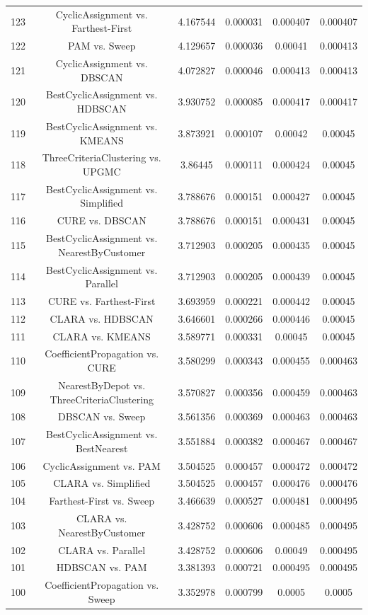 \documentclass[a4paper,10pt]{article}
\begin{document}
\begin{landscape}
\begin{table}[!htp]
\begin{tabular}{cccccc}
123&CyclicAssignment vs. Farthest-First&4.167544&0.000031&0.000407&0.000407\\
122&PAM vs. Sweep&4.129657&0.000036&0.00041&0.000413\\
121&CyclicAssignment vs. DBSCAN&4.072827&0.000046&0.000413&0.000413\\
120&BestCyclicAssignment vs. HDBSCAN&3.930752&0.000085&0.000417&0.000417\\
119&BestCyclicAssignment vs. KMEANS&3.873921&0.000107&0.00042&0.00045\\
118&ThreeCriteriaClustering vs. UPGMC&3.86445&0.000111&0.000424&0.00045\\
117&BestCyclicAssignment vs. Simplified&3.788676&0.000151&0.000427&0.00045\\
116&CURE vs. DBSCAN&3.788676&0.000151&0.000431&0.00045\\
115&BestCyclicAssignment vs. NearestByCustomer&3.712903&0.000205&0.000435&0.00045\\
114&BestCyclicAssignment vs. Parallel&3.712903&0.000205&0.000439&0.00045\\
113&CURE vs. Farthest-First&3.693959&0.000221&0.000442&0.00045\\
112&CLARA vs. HDBSCAN&3.646601&0.000266&0.000446&0.00045\\
111&CLARA vs. KMEANS&3.589771&0.000331&0.00045&0.00045\\
110&CoefficientPropagation vs. CURE&3.580299&0.000343&0.000455&0.000463\\
109&NearestByDepot vs. ThreeCriteriaClustering&3.570827&0.000356&0.000459&0.000463\\
108&DBSCAN vs. Sweep&3.561356&0.000369&0.000463&0.000463\\
107&BestCyclicAssignment vs. BestNearest&3.551884&0.000382&0.000467&0.000467\\
106&CyclicAssignment vs. PAM&3.504525&0.000457&0.000472&0.000472\\
105&CLARA vs. Simplified&3.504525&0.000457&0.000476&0.000476\\
104&Farthest-First vs. Sweep&3.466639&0.000527&0.000481&0.000495\\
103&CLARA vs. NearestByCustomer&3.428752&0.000606&0.000485&0.000495\\
102&CLARA vs. Parallel&3.428752&0.000606&0.00049&0.000495\\
101&HDBSCAN vs. PAM&3.381393&0.000721&0.000495&0.000495\\
100&CoefficientPropagation vs. Sweep&3.352978&0.000799&0.0005&0.0005\\

\end{tabular}
\end{table}
\end{landscape}
\end{document}
